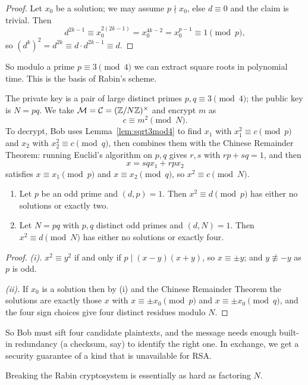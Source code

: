 \documentclass[a4paper]{scrartcl}
\newcommand{\Cc}{\mathcal{C}}
\newcommand{\Mc}{\mathcal{M}}
\begin{document}
\begin{proof}
	Let $x_0$ be a solution; we may assume $p \nmid x_0$, else $d \equiv 0$ and the claim is trivial. Then
	$$d^{2k-1}\equiv x_0^{2(2k-1)} = x_0^{4k-2}=x_0^{p-1}\equiv1\pmod p,$$
	so $(d^k)^2 = d^{2k} \equiv d\cdot d^{2k-1}\equiv d$.
\end{proof}

So modulo a prime $p \equiv 3\pmod 4$ we can extract square roots in polynomial time. This is the basis of Rabin's scheme.

The private key is a pair of large distinct primes $p,q \equiv 3\pmod 4$; the public key is $N = pq$. We take $\Mc = \Cc = (\Z/N\Z)^\times$ and encrypt $m$ as
$$c \equiv m^2 \pmod N.$$
To decrypt, Bob uses Lemma~\ref{lem:sqrt3mod4} to find $x_1$ with $x_1^2\equiv c \pmod p$ and $x_2$ with $x_2^2\equiv c\pmod q$, then combines them with the Chinese Remainder Theorem: running Euclid's algorithm on $p,q$ gives $r,s$ with $rp+sq=1$, and then
$$x = sqx_1+rpx_2$$
satisfies $x \equiv x_1 \pmod p$ and $x\equiv x_2\pmod q$, so $x^2\equiv c\pmod N$.

\begin{lemma}
	\begin{enumerate}[label=(\roman*)]
		\item Let $p$ be an odd prime and $(d,p)=1$. Then $x^2\equiv d\pmod p$ has either no solutions or exactly two.
		\item Let $N = pq$ with $p,q$ distinct odd primes and $(d,N)=1$. Then $x^2\equiv d\pmod N$ has either no solutions or exactly four.
	\end{enumerate}
\end{lemma}

\begin{proof}
	\emph{(i).} $x^2\equiv y^2$ if and only if $p \mid (x-y)(x+y)$, so $x\equiv\pm y$; and $y\not\equiv-y$ as $p$ is odd.

	\emph{(ii).} If $x_0$ is a solution then by (i) and the Chinese Remainder Theorem the solutions are exactly those $x$ with $x\equiv\pm x_0 \pmod p$ and $x \equiv \pm x_0\pmod q$, and the four sign choices give four distinct residues modulo $N$.
\end{proof}

So Bob must sift four candidate plaintexts, and the message needs enough built-in redundancy (a checksum, say) to identify the right one. In exchange, we get a security guarantee of a kind that is unavailable for RSA.

\begin{theorem}
	Breaking the Rabin cryptosystem is essentially as hard as factoring $N$.
\end{theorem}
\end{document}
